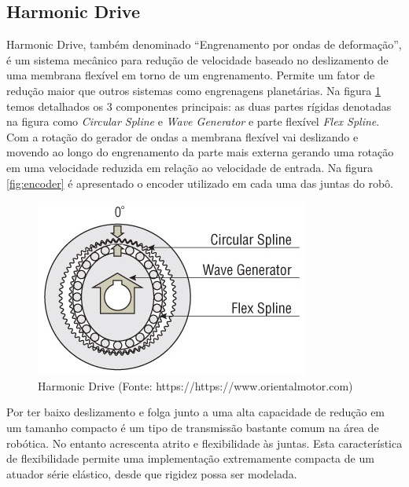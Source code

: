 \subsection{Harmonic Drive \label{subsec:harmonic-drive}}

Harmonic Drive, também denominado ``Engrenamento por ondas de deformação'', é um sistema mecânico para redução de velocidade baseado no deslizamento de uma membrana flexível em torno de um engrenamento. Permite um fator de redução maior que outros sistemas como engrenagens planetárias. Na figura \ref{fig:harmonic_drive} temos detalhados os 3 componentes principais: as duas partes rígidas denotadas na figura como \textit{Circular Spline} e \textit{Wave Generator} e parte flexível \textit{Flex Spline}. Com a rotação do gerador de ondas a membrana flexível vai deslizando e movendo ao longo do engrenamento da parte mais externa gerando uma rotação em uma velocidade reduzida em relação ao velocidade de entrada. Na figura \ref{fig:encoder} é apresentado o encoder utilizado em cada uma das juntas do robô.

\begin{figure}[H]
    \centering
    \includegraphics[width=0.6\linewidth]{tex/figs/harmonic-gear-structure.jpg}
    \caption{Harmonic Drive (Fonte: https://https://www.orientalmotor.com)}
    \label{fig:harmonic_drive}
\end{figure}

Por ter baixo deslizamento e folga junto a uma alta capacidade de redução em um tamanho compacto é um tipo de transmissão bastante comum na área de robótica. No entanto acrescenta atrito e flexibilidade às juntas. Esta característica de flexibilidade permite uma implementação extremamente compacta de um atuador série elástico, desde que rigidez possa ser modelada. %


